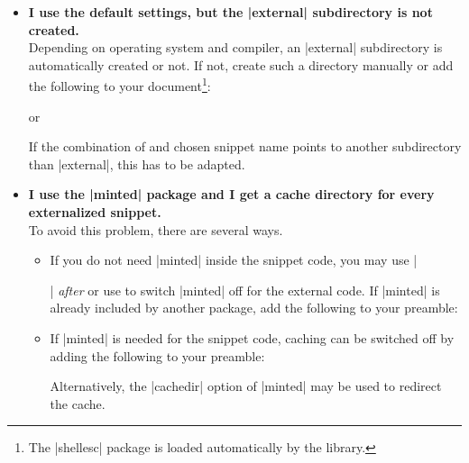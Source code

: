 \begin{itemize}

\item\textbf{I use the default settings, but the |external| subdirectory is
  not created.}\\
  Depending on operating system and compiler, an |external| subdirectory is
  automatically created or not. If not, create such a directory manually
  or add the following to your document\footnote{The |shellesc| package
  is loaded automatically by the library.}:
\begin{dispListing}
\end{dispListing}
or
\begin{dispListing}
\end{dispListing}
  If the combination of  and chosen snippet
  name points to another subdirectory than |external|, this has to be
  adapted.

\item\textbf{I use the |minted| package and I get a cache directory for
  every externalized snippet.}\\
  To avoid this problem, there are several ways.
  \begin{itemize}
  \item If you do not need |minted| inside the snippet code, you may use
    |\usepackage{minted}| \emph{after} 
    or use  to switch |minted| off for the external code.
    If |minted| is already included by another package, add the following to
    your preamble:
\begin{dispListing}
\end{dispListing}
  \item If |minted| is needed for the snippet code, caching can be switched
    off by adding the following to your preamble:
\begin{dispListing}
\end{dispListing}
  Alternatively, the |cachedir| option of |minted| may be used to redirect
  the cache.
  \end{itemize}


\end{itemize}

